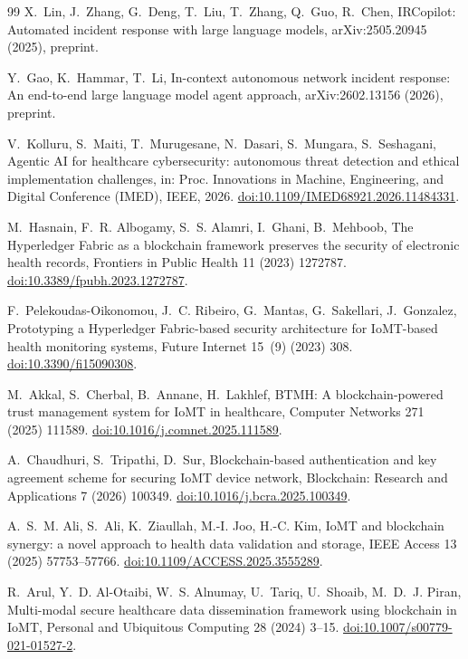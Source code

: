 \documentclass[preprint,12pt]{elsarticle}
\begin{document}
\begin{thebibliography}{99}
 X.~Lin, J.~Zhang, G.~Deng, T.~Liu, T.~Zhang, Q.~Guo, R.~Chen, IRCopilot: Automated incident response with large language models, arXiv:2505.20945 (2025), preprint.

 Y.~Gao, K.~Hammar, T.~Li, In-context autonomous network incident response: An end-to-end large language model agent approach, arXiv:2602.13156 (2026), preprint.

 V.~Kolluru, S.~Maiti, T.~Murugesane, N.~Dasari, S.~Mungara, S.~Seshagani, Agentic AI for healthcare cybersecurity: autonomous threat detection and ethical implementation challenges, in: Proc. Innovations in Machine, Engineering, and Digital Conference (IMED), IEEE, 2026. \href{https://doi.org/10.1109/IMED68921.2026.11484331}{doi:10.1109/IMED68921.2026.11484331}.

 M.~Hasnain, F.~R. Albogamy, S.~S. Alamri, I.~Ghani, B.~Mehboob, The Hyperledger Fabric as a blockchain framework preserves the security of electronic health records, Frontiers in Public Health 11 (2023) 1272787. \href{https://doi.org/10.3389/fpubh.2023.1272787}{doi:10.3389/fpubh.2023.1272787}.

 F.~Pelekoudas-Oikonomou, J.~C. Ribeiro, G.~Mantas, G.~Sakellari, J.~Gonzalez, Prototyping a Hyperledger Fabric-based security architecture for IoMT-based health monitoring systems, Future Internet 15~(9) (2023) 308. \href{https://doi.org/10.3390/fi15090308}{doi:10.3390/fi15090308}.

 M.~Akkal, S.~Cherbal, B.~Annane, H.~Lakhlef, BTMH: A blockchain-powered trust management system for IoMT in healthcare, Computer Networks 271 (2025) 111589. \href{https://doi.org/10.1016/j.comnet.2025.111589}{doi:10.1016/j.comnet.2025.111589}.

 A.~Chaudhuri, S.~Tripathi, D.~Sur, Blockchain-based authentication and key agreement scheme for securing IoMT device network, Blockchain: Research and Applications 7 (2026) 100349. \href{https://doi.org/10.1016/j.bcra.2025.100349}{doi:10.1016/j.bcra.2025.100349}.

 A.~S.~M. Ali, S.~Ali, K.~Ziaullah, M.-I. Joo, H.-C. Kim, IoMT and blockchain synergy: a novel approach to health data validation and storage, IEEE Access 13 (2025) 57753--57766. \href{https://doi.org/10.1109/ACCESS.2025.3555289}{doi:10.1109/ACCESS.2025.3555289}.

 R.~Arul, Y.~D. Al-Otaibi, W.~S. Alnumay, U.~Tariq, U.~Shoaib, M.~D.~J. Piran, Multi-modal secure healthcare data dissemination framework using blockchain in IoMT, Personal and Ubiquitous Computing 28 (2024) 3--15. \href{https://doi.org/10.1007/s00779-021-01527-2}{doi:10.1007/s00779-021-01527-2}.


\end{thebibliography}
\end{document}
